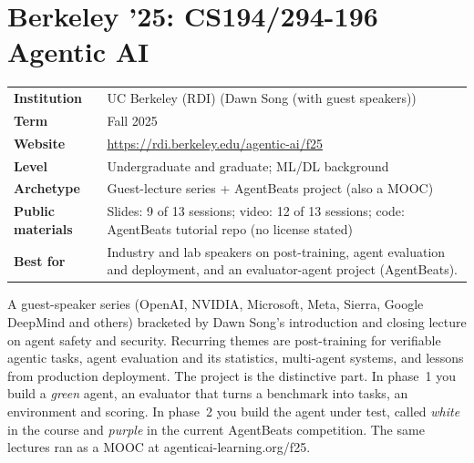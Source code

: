 \documentclass[10pt,oneside]{report}
\begin{document}
\chapter{Berkeley '25: CS194/294-196 Agentic AI}\hypertarget{course-BRKAG}{}
{\small\begin{tabularx}{\linewidth}{@{}>{\bfseries}l X@{}}\toprule
Institution & UC Berkeley (RDI) (Dawn Song (with guest speakers))\\
Term & Fall 2025\\
Website & \href{https://rdi.berkeley.edu/agentic-ai/f25}{https://rdi.berkeley.edu/agentic-ai/f25}\\
Level & Undergraduate and graduate; ML/DL background\\
Archetype & Guest-lecture series + AgentBeats project (also a MOOC)\\
Public materials & Slides: 9 of 13 sessions; video: 12 of 13 sessions; code: AgentBeats tutorial repo (no license stated)\\
Best for & Industry and lab speakers on post-training, agent evaluation and deployment, and an evaluator-agent project (AgentBeats).\\
\bottomrule\end{tabularx}}

A guest-speaker series (OpenAI, NVIDIA, Microsoft, Meta, Sierra, Google DeepMind and others) bracketed by Dawn Song's introduction and closing lecture on agent safety and security.
Recurring themes are post-training for verifiable agentic tasks, agent evaluation and its statistics, multi-agent systems, and lessons from production deployment.
The project is the distinctive part. In phase~1 you build a \emph{green} agent, an evaluator that turns a benchmark into tasks, an environment and scoring. In phase~2 you build the agent under test, called \emph{white} in the course and \emph{purple} in the current AgentBeats competition.
The same lectures ran as a MOOC at agenticai-learning.org/f25.
\end{document}
